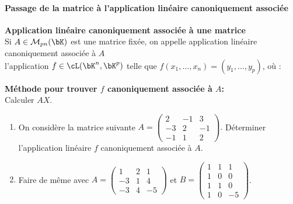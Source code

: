 \documentclass[a4paper, 11pt]{article}
\begin{document}
\vspace{0.4cm}
\paragraph{Passage de la matrice \`{a} l'application lin\'eaire canoniquement associ\'ee}



\begin{defi} \textbf{Application lin\'eaire canoniquement associ\'ee \`{a} une matrice}\\
\noindent Si $A\in\mathcal{M}_{pn}(\bK)$ est une matrice fix\'ee, on appelle application lin\'eaire canoniquement associ\'ee \`a $A$ \vsec\\
l'application $f \in \cL(\bK^n, \bK^p)$ telle que $f(x_1, \ldots, x_n) = (y_1, \ldots, y_p)$, o\`u : \vsec
\vspace{0.5cm}
\end{defi}

\begin{dboxminipage}{0.8\textwidth}
\textbf{M\'ethode pour trouver $f$ canoniquement associ\'ee \`{a} $A$:}\\ 
Calculer $AX$.
\end{dboxminipage}



{\footnotesize \begin{exercice} 
\begin{enumerate}
\item On consid\`ere la matrice suivante $A=\left( \begin{array}{rrr} 2&-1&3\\-3&2&-1\\-1&1&2   \end{array}\right).$ D\'eterminer l'application lin\'eaire $f$ canoniquement associ\'ee \`a $A$.
\item Faire de m\^{e}me avec $A=\left(\begin{array}{rrr} 1&2&1\\-3&1&4\\-3&4&-5   \end{array}\right)$ et $B=\left(\begin{array}{rrr} 1&1&1\\1&0&0\\1&1&0\\ 1&0&-5   \end{array}\right)$.
\end{enumerate}
\end{exercice}
}
\end{document}
